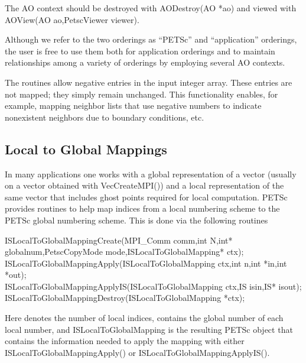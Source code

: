 The AO context should be destroyed with AODestroy(AO *ao)
and viewed with AOView(AO ao,PetscViewer viewer).

Although we refer to the two orderings as ``PETSc'' and
``application'' orderings, the user is free to use them both for
application orderings and to maintain relationships among a variety of
orderings by employing several AO contexts.

The  routines allow negative entries in the input
integer array. These entries are not mapped; they simply remain
unchanged.  This functionality enables, for example, mapping neighbor
lists that use negative numbers to indicate nonexistent neighbors due
to boundary conditions, etc.

\subsection{Local to Global Mappings}
\label{sec_islocaltoglobalmapping}

In many applications one works with a global representation of a vector
(usually on a vector obtained with VecCreateMPI())
and a local representation of the same vector that includes ghost points
required for local computation.  
 
PETSc provides routines to help map indices from a local numbering scheme to
the PETSc global numbering scheme. This is done via the following routines
\begin{tabbing}
  ISLocalToGlobalMappingCreate(MPI\_Comm comm,int N,int* globalnum,PetscCopyMode mode,ISLocalToGlobalMapping* ctx);\\
  ISLocalToGlobalMappingApply(ISLocalToGlobalMapping ctx,int n,int *in,int *out);\\
  ISLocalToGlobalMappingApplyIS(ISLocalToGlobalMapping ctx,IS isin,IS* isout);\\
  ISLocalToGlobalMappingDestroy(ISLocalToGlobalMapping *ctx);
\end{tabbing}
Here  denotes the number of local indices,  contains the
global number of each local number, and ISLocalToGlobalMapping is the
resulting PETSc object that contains the information needed to apply the mapping with
either ISLocalToGlobalMappingApply() or
ISLocalToGlobalMappingApplyIS().

